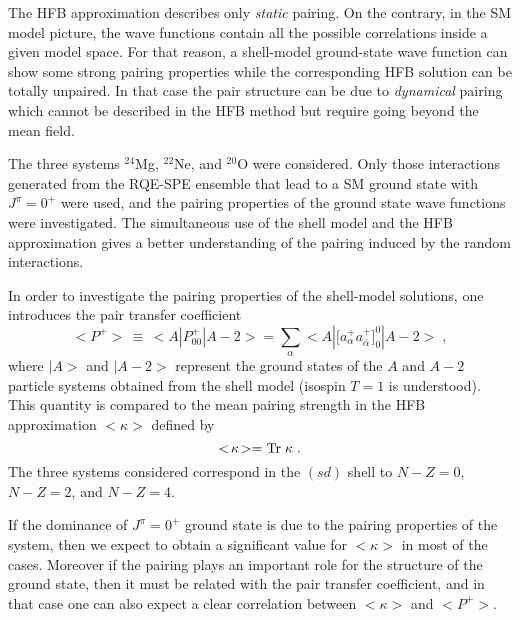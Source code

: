 \documentclass[preprint,rmp,aps,floatfix]{revtex4}
\begin{document}
The HFB approximation describes
only {\it static} pairing. On the contrary, in the SM model picture, the
wave functions contain all the possible correlations inside a given model
space. For that reason, a shell-model ground-state 
wave function can show some strong pairing
properties while the corresponding HFB solution can be totally unpaired.
In that case the pair structure can be due to {\it dynamical} pairing
which cannot be described in the HFB method but require going beyond
the mean field.

The three 
systems $^{24}$Mg, $^{22}$Ne, and $^{20}$O were considered. 
Only those interactions generated from the RQE-SPE ensemble
that lead to a SM ground state with $J^\pi=0^+$ were used,
and 
the pairing properties of the ground state
wave functions were investigated. The simultaneous use of the shell model 
and the HFB approximation gives a better understanding of the pairing
induced by the random interactions.

In order to investigate the pairing properties of the shell-model
solutions, one introduces the pair transfer coefficient
%
\begin{equation}
<P^+>\,\equiv\,<A|P^+_{00}|A-2>
=\sum_{\alpha}<A|\big[a_\alpha^+a_{\bar\alpha}^+\big]^0_0|A-2>\;,
\end{equation}
%
where $|A>$ and $|A-2>$ represent the ground states of the $A$ and $A-2$
particle systems obtained from the shell model (isospin $T=1$ is understood).
This quantity is compared
to the mean pairing strength in the HFB approximation $<\kappa>$ defined
by
%
\begin{equation}
<\!\kappa\!>={\rm Tr}\;\kappa\;.
\end{equation}
%
The three systems considered correspond
in the $(sd)$ shell to $N-Z=0$, $N-Z=2$, and
$N-Z=4$. 

If the dominance of $J^\pi=0^+$ ground state is due to the pairing
properties of the system, then we expect to obtain a significant value
for $<\!\kappa\!>$ in most of the cases. Moreover if the pairing plays
an important role for the structure of the ground state, then it must
be related with the pair transfer coefficient, and in that case one can
also expect a clear correlation between $<\!\kappa\!>$ and $<\!P^+\!>$.
\end{document}
